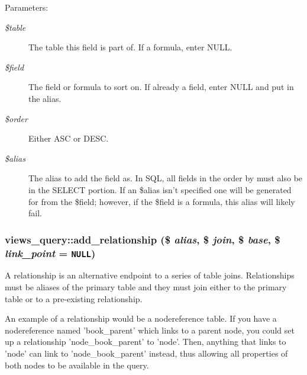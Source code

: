 \begin{Desc}
\item[Parameters:]
\begin{description}
\item[{\em \$table}]The table this field is part of. If a formula, enter NULL. \item[{\em \$field}]The field or formula to sort on. If already a field, enter NULL and put in the alias. \item[{\em \$order}]Either ASC or DESC. \item[{\em \$alias}]The alias to add the field as. In SQL, all fields in the order by must also be in the SELECT portion. If an \$alias isn't specified one will be generated for from the \$field; however, if the \$field is a formula, this alias will likely fail. \end{description}
\end{Desc}
\hypertarget{classviews__query_db0faccc1a266ce414a3dc58f4de22d0}{
\subsubsection[{add\_\-relationship}]{\setlength{\rightskip}{0pt plus 5cm}views\_\-query::add\_\-relationship (\$ {\em alias}, \/  \$ {\em join}, \/  \$ {\em base}, \/  \$ {\em link\_\-point} = {\tt NULL})}}
\label{classviews__query_db0faccc1a266ce414a3dc58f4de22d0}


A relationship is an alternative endpoint to a series of table joins. Relationships must be aliases of the primary table and they must join either to the primary table or to a pre-existing relationship.

An example of a relationship would be a nodereference table. If you have a nodereference named 'book\_\-parent' which links to a parent node, you could set up a relationship 'node\_\-book\_\-parent' to 'node'. Then, anything that links to 'node' can link to 'node\_\-book\_\-parent' instead, thus allowing all properties of both nodes to be available in the query.

